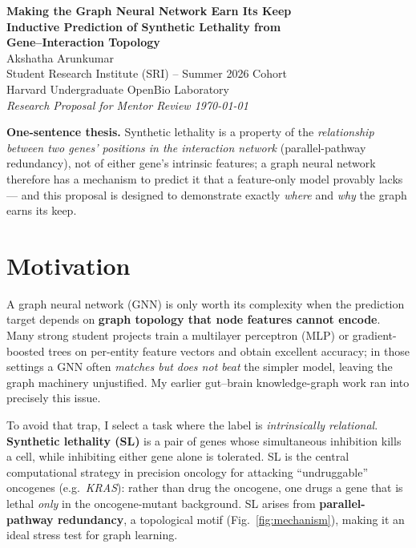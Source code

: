 \documentclass[11pt]{article}
\begin{document}
\begin{center}
  {\LARGE\bfseries\color{sriblue} Making the Graph Neural Network Earn Its Keep}\\[2pt]
  {\large\bfseries\color{sriblue!80!black} Inductive Prediction of Synthetic Lethality from\\ Gene--Interaction Topology}\\[10pt]
  {\large Akshatha Arunkumar}\\[2pt]
  {\small Student Research Institute (SRI) -- Summer 2026 Cohort \\
  Harvard Undergraduate OpenBio Laboratory}\\[2pt]
  {\small\itshape Research Proposal for Mentor Review \quad\textbar\quad \today}
\end{center}

\vspace{2pt}
\begin{thesisbox}
\textbf{One-sentence thesis.} Synthetic lethality is a property of the
\emph{relationship between two genes' positions in the interaction network}
(parallel-pathway redundancy), not of either gene's intrinsic features; a graph
neural network therefore has a mechanism to predict it that a feature-only model
provably lacks --- and this proposal is designed to demonstrate exactly
\emph{where} and \emph{why} the graph earns its keep.
\end{thesisbox}

\section{Motivation}

A graph neural network (GNN) is only worth its complexity when the prediction
target depends on \textbf{graph topology that node features cannot encode}.
Many strong student projects train a multilayer perceptron (MLP) or gradient-
boosted trees on per-entity feature vectors and obtain excellent accuracy; in
those settings a GNN often \emph{matches but does not beat} the simpler model,
leaving the graph machinery unjustified. My earlier gut--brain knowledge-graph
work ran into precisely this issue.

To avoid that trap, I select a task where the label is \emph{intrinsically
relational}. \textbf{Synthetic lethality (SL)} is a pair of genes whose
simultaneous inhibition kills a cell, while inhibiting either gene alone is
tolerated. SL is the central computational strategy in precision oncology for
attacking ``undruggable'' oncogenes (e.g.\ \textit{KRAS}): rather than drug the
oncogene, one drugs a gene that is lethal \emph{only} in the oncogene-mutant
background. SL arises from \textbf{parallel-pathway redundancy}, a topological
motif (Fig.~\ref{fig:mechanism}), making it an ideal stress test for graph
learning.
\end{document}
